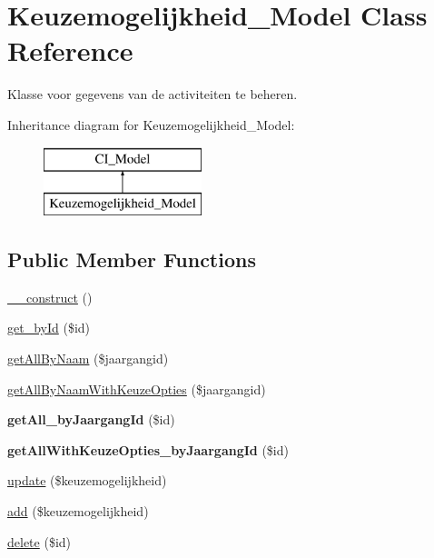 \hypertarget{class_keuzemogelijkheid___model}{}\section{Keuzemogelijkheid\+\_\+\+Model Class Reference}
\label{class_keuzemogelijkheid___model}


Klasse voor gegevens van de activiteiten te beheren.  


Inheritance diagram for Keuzemogelijkheid\+\_\+\+Model\+:\begin{figure}[H]
\begin{center}
\leavevmode
\includegraphics[height=2.000000cm]{class_keuzemogelijkheid___model}
\end{center}
\end{figure}
\subsection*{Public Member Functions}
\begin{DoxyCompactItemize}
\item 
\mbox{\hyperlink{class_keuzemogelijkheid___model_af2af463bdcd6443ce1a30dade7d100c2}{\+\_\+\+\_\+construct}} ()
\item 
\mbox{\hyperlink{class_keuzemogelijkheid___model_a88c8b0a6b02a7da7c5d1d573a66c11c7}{get\+\_\+by\+Id}} (\$id)
\item 
\mbox{\hyperlink{class_keuzemogelijkheid___model_a4bd9ea550274de1237a3692a7b20c6d0}{get\+All\+By\+Naam}} (\$jaargangid)
\item 
\mbox{\hyperlink{class_keuzemogelijkheid___model_ac8d5fc8e9e11684de17948fb985466c3}{get\+All\+By\+Naam\+With\+Keuze\+Opties}} (\$jaargangid)
\item 
\mbox{\label{class_keuzemogelijkheid___model_a384efcd56387e3852dc75a5f1d4f5b9e}} 
{\bfseries get\+All\+\_\+by\+Jaargang\+Id} (\$id)
\item 
\mbox{\label{class_keuzemogelijkheid___model_a2351480e07cbf850f42aadc20959668a}} 
{\bfseries get\+All\+With\+Keuze\+Opties\+\_\+by\+Jaargang\+Id} (\$id)
\item 
\mbox{\hyperlink{class_keuzemogelijkheid___model_ab075f39b3a3ea0b4ee501c57ee9ca56c}{update}} (\$keuzemogelijkheid)
\item 
\mbox{\hyperlink{class_keuzemogelijkheid___model_a420eeb2819baee7810c6f75adc37bccd}{add}} (\$keuzemogelijkheid)
\item 
\mbox{\hyperlink{class_keuzemogelijkheid___model_a85892ff217264f748b19a7da2797a9c7}{delete}} (\$id)
\end{DoxyCompactItemize}


